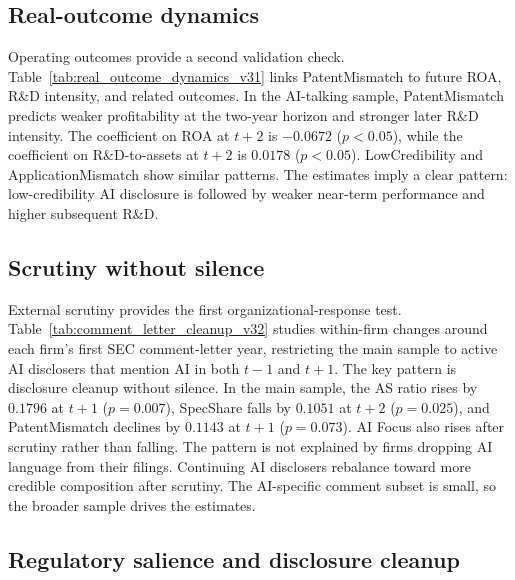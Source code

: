 \subsection{Real-outcome dynamics}

Operating outcomes provide a second validation check. Table~\ref{tab:real_outcome_dynamics_v31} links PatentMismatch to future ROA, R\&D intensity, and related outcomes. In the AI-talking sample, PatentMismatch predicts weaker profitability at the two-year horizon and stronger later R\&D intensity. The coefficient on ROA at $t+2$ is $-0.0672$ ($p<0.05$), while the coefficient on R\&D-to-assets at $t+2$ is $0.0178$ ($p<0.05$). LowCredibility and ApplicationMismatch show similar patterns. The estimates imply a clear pattern: low-credibility AI disclosure is followed by weaker near-term performance and higher subsequent R\&D.



\subsection{Scrutiny without silence}

External scrutiny provides the first organizational-response test. Table~\ref{tab:comment_letter_cleanup_v32} studies within-firm changes around each firm's first SEC comment-letter year, restricting the main sample to active AI disclosers that mention AI in both $t-1$ and $t+1$. The key pattern is disclosure cleanup without silence. In the main sample, the AS ratio rises by $0.1796$ at $t+1$ ($p=0.007$), SpecShare falls by $0.1051$ at $t+2$ ($p=0.025$), and PatentMismatch declines by $0.1143$ at $t+1$ ($p=0.073$). AI Focus also rises after scrutiny rather than falling. The pattern is not explained by firms dropping AI language from their filings. Continuing AI disclosers rebalance toward more credible composition after scrutiny. The AI-specific comment subset is small, so the broader sample drives the estimates.



\subsection{Regulatory salience and disclosure cleanup}

